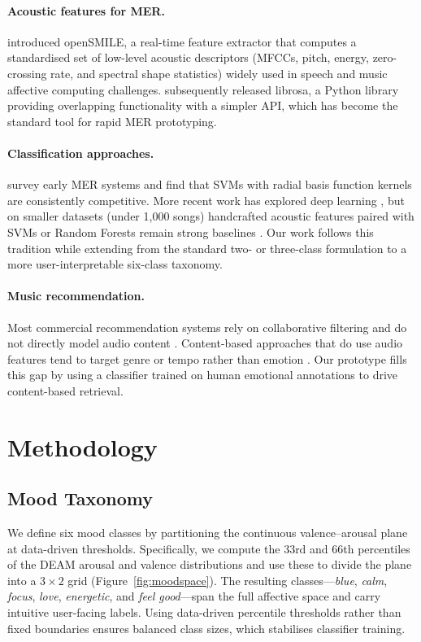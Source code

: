 \documentclass{article}
\begin{document}
\paragraph{Acoustic features for MER.}
\citet{eyben2010opensmile} introduced openSMILE, a real-time feature extractor
that computes a standardised set of low-level acoustic descriptors (MFCCs,
pitch, energy, zero-crossing rate, and spectral shape statistics) widely used
in speech and music affective computing challenges.
\citet{mcfee2015librosa} subsequently released librosa, a Python library
providing overlapping functionality with a simpler API, which has become the
standard tool for rapid MER prototyping.

\paragraph{Classification approaches.}
\citet{yang2012machine} survey early MER systems and find that SVMs with
radial basis function kernels are consistently competitive.
More recent work has explored deep learning \citep{pons2017timbre}, but on
smaller datasets (under 1{,}000 songs) handcrafted acoustic features paired
with SVMs or Random Forests remain strong baselines \citep{eerola2011comparison}.
Our work follows this tradition while extending from the standard two- or
three-class formulation to a more user-interpretable six-class taxonomy.

\paragraph{Music recommendation.}
Most commercial recommendation systems rely on collaborative filtering and
do not directly model audio content \citep{schedl2018current}.
Content-based approaches that do use audio features tend to target genre or
tempo rather than emotion \citep{tzanetakis2002musical}.
Our prototype fills this gap by using a classifier trained on human emotional
annotations to drive content-based retrieval.

%
\section{Methodology}
%

\subsection{Mood Taxonomy}

We define six mood classes by partitioning the continuous valence--arousal
plane at data-driven thresholds.
Specifically, we compute the 33rd and 66th percentiles of the DEAM arousal
and valence distributions and use these to divide the plane into a $3 \times 2$
grid (Figure~\ref{fig:moodspace}).
The resulting classes---\textit{blue}, \textit{calm}, \textit{focus},
\textit{love}, \textit{energetic}, and \textit{feel good}---span the full
affective space and carry intuitive user-facing labels.
Using data-driven percentile thresholds rather than fixed boundaries ensures
balanced class sizes, which stabilises classifier training.
\end{document}
